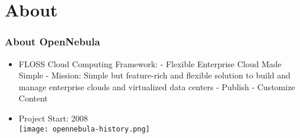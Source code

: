 \section{About}

\begin{frame}[allowframebreaks]
\frametitle{About OpenNebula}

\begin{itemize}
	\item FLOSS Cloud Computing Framework:\linebreak
	- Flexible Enterprise Cloud Made Simple\linebreak
	- Mission: Simple but feature-rich and flexible solution to build and manage enterprise clouds and virtualized data centers\linebreak
	- Publish\linebreak
	- Customize Content
	\item Project Start: 2008\\
 \texttt{[image: opennebula-history.png]}
\end{itemize}

\end{frame}
